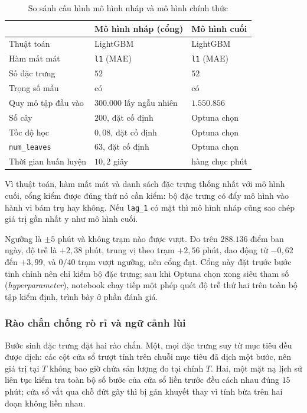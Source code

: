 \documentclass[12pt, a4paper]{report}
\begin{document}
\begin{table}[htbp]
\centering
\caption{So sánh cấu hình mô hình nháp và mô hình chính thức}
\label{tab:mo_hinh_nhap}
\small
\begin{tabular}{@{}L{4.6cm} L{4.9cm} L{4.6cm}@{}}
\toprule
 & \textbf{Mô hình nháp (cổng)} & \textbf{Mô hình cuối} \\
\midrule
Thuật toán & LightGBM & LightGBM \\
Hàm mất mát & \texttt{l1} (MAE) & \texttt{l1} (MAE) \\
Số đặc trưng & $52$ & $52$ \\
Trọng số mẫu & có & có \\
\addlinespace
Quy mô tập đầu vào & $300.000$ lấy ngẫu nhiên & $1.550.856$ \\
Số cây & $200$, đặt cố định & Optuna chọn \\
Tốc độ học & $0{,}08$, đặt cố định & Optuna chọn \\
\texttt{num\_leaves} & $63$, đặt cố định & Optuna chọn \\
Thời gian huấn luyện & $10{,}2$ giây & hàng chục phút \\
\bottomrule
\end{tabular}


\end{table}

Vì thuật toán, hàm mất mát và danh sách đặc trưng thống nhất với mô hình cuối, cổng kiểm được đúng
thứ nó cần kiểm: bộ đặc trưng có đẩy mô hình vào hành vi bám trụ hay không. Nếu
\texttt{lag\_1} có mặt thì mô hình nháp cũng sao chép giá trị gần nhất y như mô hình cuối.

Ngưỡng là $\pm 5$ phút và không trạm nào được vượt. Đo trên $288.136$ điểm ban ngày, độ
trễ là $+2{,}38$ phút, trung vị theo trạm $+2{,}56$ phút, dao động từ $-0{,}62$ đến
$+3{,}99$, và $0/40$ trạm vượt ngưỡng, nên cổng đạt. Cổng này đặt trước bước tinh chỉnh
nên chỉ kiểm bộ đặc trưng; sau khi Optuna chọn xong siêu tham số (\textit{hyperparameter}), notebook chạy tiếp một
phép quét độ trễ thứ hai trên toàn bộ tập kiểm định, trình bày ở phần đánh giá.

\subsubsection{Rào chắn chống rò rỉ và ngữ cảnh lùi}

Bước sinh đặc trưng đặt hai rào chắn. Một, mọi đặc trưng suy từ mục tiêu đều được dịch:
các cột cửa sổ trượt tính trên chuỗi mục tiêu đã dịch một bước, nên giá trị tại $T$ không
bao giờ chứa sản lượng đo tại chính $T$. Hai, một mặt nạ lịch sử liên tục kiểm tra toàn
bộ số bước của cửa sổ liền trước đều cách nhau đúng $15$ phút; cửa sổ vắt qua chỗ đứt gãy
thì bị gán khuyết thay vì tính bừa trên hai đoạn không liền nhau.
\end{document}
